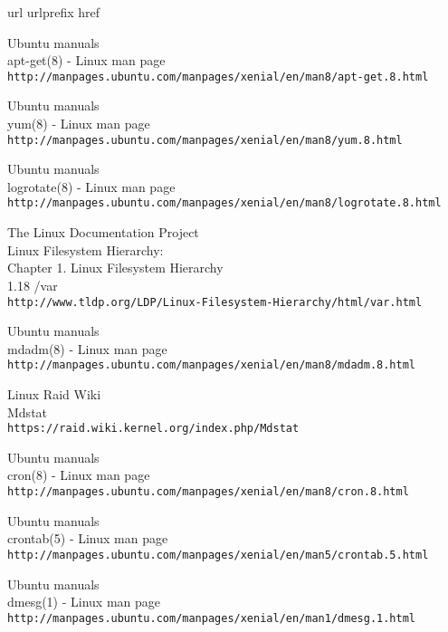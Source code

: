 \begin{thebibliography}{10}
\expandafter\ifx\csname url\endcsname\relax
  \def\url#1{\texttt{#1}}\fi
\expandafter\ifx\csname urlprefix\endcsname\relax\def\urlprefix{URL }\fi
\expandafter\ifx\csname href\endcsname\relax
  \def\href#1#2{#2} \def\path#1{#1}\fi

Ubuntu manuals\\
apt-get(8) - Linux man page\\
  \url{http://manpages.ubuntu.com/manpages/xenial/en/man8/apt-get.8.html}

Ubuntu manuals\\
yum(8) - Linux man page\\
  \url{http://manpages.ubuntu.com/manpages/xenial/en/man8/yum.8.html}

Ubuntu manuals\\
logrotate(8) - Linux man page\\
  \url{http://manpages.ubuntu.com/manpages/xenial/en/man8/logrotate.8.html}

The Linux Documentation Project\\
Linux Filesystem Hierarchy:\\
Chapter 1. Linux Filesystem Hierarchy\\
1.18 \slash var \\
  \url{http://www.tldp.org/LDP/Linux-Filesystem-Hierarchy/html/var.html}

Ubuntu manuals\\
mdadm(8) - Linux man page\\
  \url{http://manpages.ubuntu.com/manpages/xenial/en/man8/mdadm.8.html}

Linux Raid Wiki\\
Mdstat\\
  \url{https://raid.wiki.kernel.org/index.php/Mdstat}

Ubuntu manuals\\
cron(8) - Linux man page\\
  \url{http://manpages.ubuntu.com/manpages/xenial/en/man8/cron.8.html}

Ubuntu manuals\\
crontab(5) - Linux man page\\
  \url{http://manpages.ubuntu.com/manpages/xenial/en/man5/crontab.5.html}

Ubuntu manuals\\
dmesg(1) - Linux man page\\
  \url{http://manpages.ubuntu.com/manpages/xenial/en/man1/dmesg.1.html}

\end{thebibliography}
